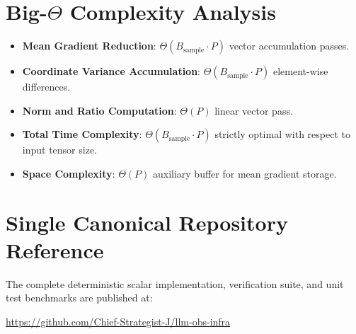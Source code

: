 \documentclass[11pt,a4paper]{article}
\theoremstyle{definition}
\begin{document}
\section{Big-$\Theta$ Complexity Analysis}

\begin{itemize}
    \item \textbf{Mean Gradient Reduction}: $\Theta(B_{\text{sample}} \cdot P)$ vector accumulation passes.
    \item \textbf{Coordinate Variance Accumulation}: $\Theta(B_{\text{sample}} \cdot P)$ element-wise differences.
    \item \textbf{Norm and Ratio Computation}: $\Theta(P)$ linear vector pass.
    \item \textbf{Total Time Complexity}: $\Theta(B_{\text{sample}} \cdot P)$ strictly optimal with respect to input tensor size.
    \item \textbf{Space Complexity}: $\Theta(P)$ auxiliary buffer for mean gradient storage.
\end{itemize}

\section{Single Canonical Repository Reference}

The complete deterministic scalar implementation, verification suite, and unit test benchmarks are published at:
\begin{center}
\url{https://github.com/Chief-Strategist-J/llm-obs-infra}
\end{center}
\end{document}
